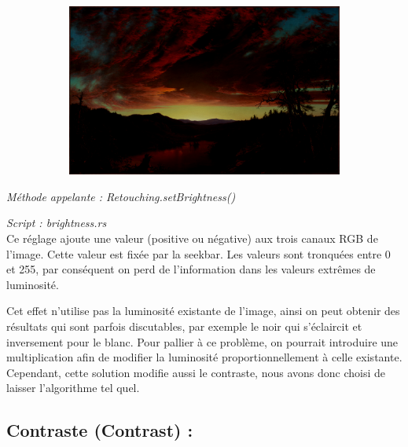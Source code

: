 \begin{figure}[!h]
\begin{subfigure}[b]{0.3\textwidth}
    \end{subfigure}
    \begin{subfigure}[b]{0.3\textwidth}
        \includegraphics[width=1\textwidth]{report_src/effects/brightness_low.jpeg}
    \end{subfigure}
\end{figure} 

\emph{Méthode appelante : Retouching.setBrightness()}

\emph{Script : brightness.rs}
\\

Ce réglage ajoute une valeur (positive ou négative) aux trois canaux RGB de l'image. Cette valeur est fixée par la seekbar.
Les valeurs sont tronquées entre 0 et 255, par conséquent on perd de l'information dans les valeurs extrêmes de luminosité.

Cet effet n'utilise pas la luminosité existante de l'image, ainsi on peut obtenir des résultats qui sont parfois discutables, par exemple
le noir qui s'éclaircit et inversement pour le blanc. Pour pallier à ce problème, on pourrait introduire une multiplication afin de modifier
la luminosité proportionnellement à celle existante. Cependant, cette solution modifie aussi le contraste, nous avons donc choisi
de laisser l'algorithme tel quel. 


\subsection{Contraste (Contrast) :}

